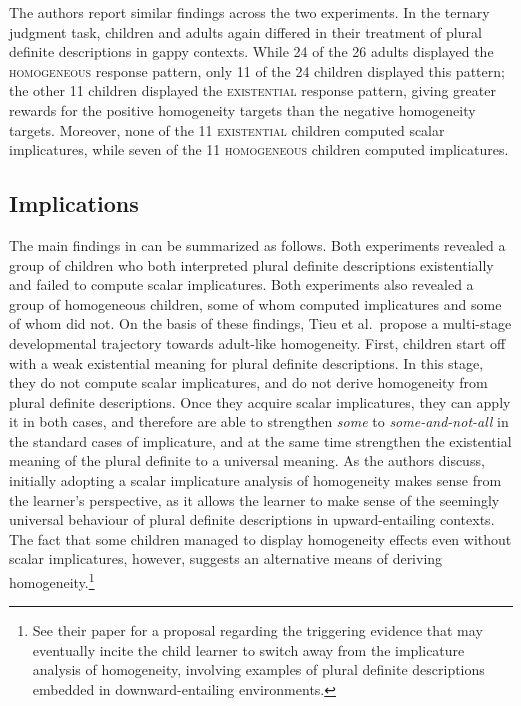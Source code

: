 \documentclass[12pt, letterpaper]{article}
\begin{document}
{The authors report similar findings across the two experiments. In the ternary judgment task, children and adults again differed in their treatment of plural definite descriptions in gappy contexts. While 24 of the 26 adults displayed the \textsc{homogeneous} response pattern, only 11 of the 24 children displayed this pattern; the other 11 children displayed the \textsc{existential} response pattern, giving greater rewards for the positive homogeneity targets than the negative homogeneity targets. Moreover, none of the 11 \textsc{existential} children computed scalar implicatures, while seven of the 11 \textsc{homogeneous} children computed implicatures.%

\subsection{Implications}

The main findings in \cite{Tieu:2015i,Tieu:2015k} can be summarized as follows. Both experiments revealed a group of children who both interpreted plural definite descriptions existentially and failed to compute scalar implicatures. Both experiments also revealed a group of homogeneous children, some of whom computed implicatures and some of whom did not. On the basis of these findings, Tieu et al.~propose a multi-stage developmental trajectory towards adult-like homogeneity. First, children start off with a weak existential meaning for plural definite descriptions. In this stage, they do not compute scalar implicatures, and do not derive homogeneity from plural definite descriptions. Once they acquire scalar implicatures, they can apply it in both cases, and therefore are able to strengthen \textit{some} to \textit{some-and-not-all} in the standard cases of implicature, and at the same time strengthen the existential meaning of the plural definite to a universal meaning. As the authors discuss, initially adopting a scalar implicature analysis of homogeneity makes sense from the learner's perspective, as it allows the learner to make sense of the seemingly universal behaviour of plural definite descriptions in upward-entailing contexts. The fact that some children managed to display homogeneity effects even without scalar implicatures, however, suggests an alternative means of deriving homogeneity.\footnote{See their paper for a proposal regarding the triggering evidence that may eventually incite the child learner to switch away from the implicature analysis of homogeneity, involving examples of plural definite descriptions embedded in downward-entailing environments.} 

}
\end{document}
